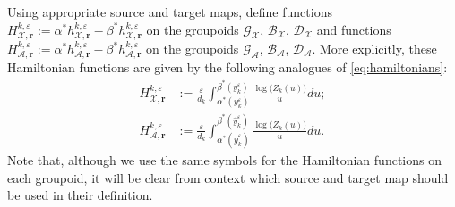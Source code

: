 \documentclass{amsart}
\numberwithin{equation}{section}
\newcommand{\bfr}{{\boldsymbol{r}}}
\newcommand{\cA}{\mathcal{A}}
\newcommand{\cB}{\mathcal{B}}
\newcommand{\cD}{\mathcal{D}}
\newcommand{\cG}{\mathcal{G}}
\newcommand{\cX}{\mathcal{X}}
\begin{document}
Using appropriate source and target maps, define functions $H_{\cX,\bfr}^{k,\varepsilon}:=\alpha^* h_{\cX,\bfr}^{k,\varepsilon}-\beta^* h_{\cX,\bfr}^{k,\varepsilon}$ on the groupoids $\cG_\cX$, $\cB_\cX$, $\cD_\cX$ and functions $H_{\cA,\bfr}^{k,\varepsilon}:=\alpha^* h_{\cA,\bfr}^{k,\varepsilon}-\beta^* h_{\cA,\bfr}^{k,\varepsilon}$ on the groupoids $\cG_\cA$, $\cB_\cA$, $\cD_\cA$.
More explicitly, these Hamiltonian functions are given by the following analogues of \eqref{eq:hamiltonians}:
\begin{align}
  \label{eq:X hamiltonian}
  H_{\cX,\bfr}^{k,\varepsilon}&:=\frac{\varepsilon}{d_k}\int_{\alpha^*(y_k^\varepsilon)}^{\beta^*(y_k^\varepsilon)} \frac{\log\big(Z_k(u)\big)}{u}du;\\
  \label{eq:A hamiltonian}
  H_{\cA,\bfr}^{k,\varepsilon}&:=\frac{\varepsilon}{d_k}\int_{\alpha^*(\hat y_k^\varepsilon)}^{\beta^*(\hat y_k^\varepsilon)} \frac{\log\big(Z_k(u)\big)}{u}du.
\end{align}
Note that, although we use the same symbols for the Hamiltonian functions on each groupoid, it will be clear from context which source and target map should be used in their definition.
\end{document}
